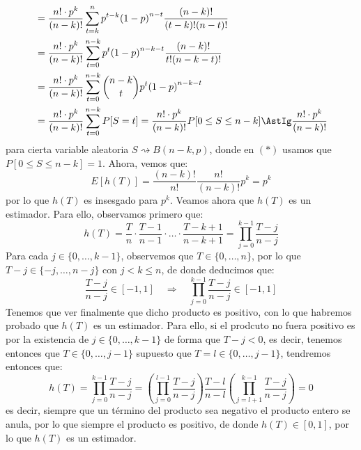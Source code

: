 \begin{ejercicio}
\begin{enumerate}[label=\alph*)]
\begin{align*}
               &= \dfrac{n!\cdot p^k }{(n-k)!}\sum_{t=k}^{n}p^{t-k}{(1-p)}^{n-t}\dfrac{(n-k)!}{(t-k)!(n-t)!} \\
               &= \dfrac{n!\cdot p^k}{(n-k)!}\sum_{t=0}^{n-k} p^t {(1-p)}^{n-k-t}\dfrac{(n-k)!}{t!(n-k-t)!} \\
               &= \dfrac{n!\cdot p^k}{(n-k)!}\sum_{t=0}^{n-k}\binom{n-k}{t} p^t {(1-p)}^{n-k-t} \\
               &= \dfrac{n!\cdot p^k}{(n-k)!}\sum_{t=0}^{n-k}P[S=t] = \dfrac{n!\cdot p^k}{(n-k)!}P[0\leq S \leq n-k] \AstIg \dfrac{n!\cdot p^k}{(n-k)!}
            \end{align*}
            para cierta variable aleatoria $S\rightsquigarrow B(n-k,p)$, donde en $(\ast)$ usamos que $P[0\leq S \leq n-k]=1$. Ahora, vemos que:
            \begin{equation*}
                E[h(T)] = \dfrac{(n-k)!}{n!}\dfrac{n!}{(n-k)!}p^k = p^k
            \end{equation*}
            por lo que $h(T)$ es insesgado para $p^k$. Veamos ahora que $h(T)$ es un estimador. Para ello, observamos primero que:
            \begin{equation*}
                h(T) = \dfrac{T}{n}\cdot \dfrac{T-1}{n-1}\cdot \ldots \cdot \dfrac{T-k+1}{n-k+1} = \prod_{j=0}^{k-1}\dfrac{T-j}{n-j}
            \end{equation*}
            Para cada $j\in \{0,\ldots,k-1\}$, observemos que $T\in \{0,\ldots,n\}$, por lo que $T-j\in \{-j, \ldots, n-j\}$ con $j<k\leq n$, de donde deducimos que:
            \begin{equation*}
                \dfrac{T-j}{n-j} \in [-1, 1] \quad \Longrightarrow \quad  \prod_{j=0}^{k-1}\dfrac{T-j}{n-j} \in [-1,1] 
            \end{equation*}
            Tenemos que ver finalmente que dicho producto es positivo, con lo que habremos probado que $h(T)$ es un estimador. Para ello, si el prodcuto no fuera positivo es por la existencia de $j\in \{0,\ldots,k-1\}$ de forma que $T-j<0$, es decir, tenemos entonces que $T\in \{0,\ldots,j-1\}$ supuesto que $T=l \in \{0,\ldots,j-1\}$, tendremos entonces que:
            \begin{equation*}
                h(T) = \prod_{j=0}^{k-1}\dfrac{T-j}{n-j} = \left(\prod_{j=0}^{l-1}\dfrac{T-j}{n-j} \right) \dfrac{T-l}{n-l} \left(\prod_{j=l+1}^{k-1}\dfrac{T-j}{n-j}\right) = 0
            \end{equation*}
            es decir, siempre que un término del producto sea negativo el producto entero se anula, por lo que siempre el producto es positivo, de donde $h(T)\in [0,1]$, por lo que $h(T)$ es un estimador.


\end{enumerate}
\end{ejercicio}
